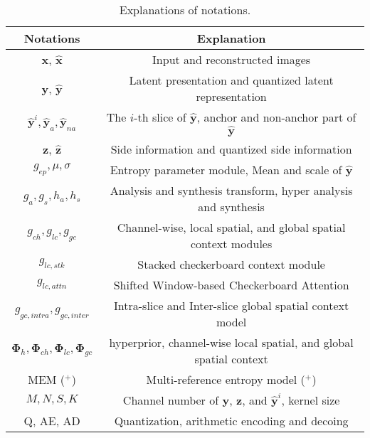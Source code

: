 \documentclass[sigconf]{acmart}
\begin{document}
\begin{table}
  \footnotesize
  \centering
  \begin{tabular}{c|c}
  \toprule
  Notations                                         & Explanation   \\ \midrule
  $\boldsymbol{x}$, $\hat{\boldsymbol{x}}$          & Input and reconstructed images              \\\midrule
  $\boldsymbol{y}$, $\hat{\boldsymbol{y}}$          & Latent presentation and quantized latent representation               \\\midrule
  $\hat{\boldsymbol{y}}^i, \hat{\boldsymbol{y}}_{a}, \hat{\boldsymbol{y}}_{na}$   & The $i$-th slice of $\hat{\boldsymbol{y}}$, anchor and non-anchor part of $\hat{\boldsymbol{y}}$             \\\midrule
  $\boldsymbol{z}$, $\hat{\boldsymbol{z}}$          & Side information and quantized side information               \\\midrule
  $g_{ep}, \mu,\sigma$                              & Entropy parameter module, Mean and scale of $\hat{\boldsymbol{y}}$           \\\midrule
  $g_a, g_s, h_a, h_s$                              & Analysis and synthesis transform, hyper analysis and synthesis          \\\midrule
  $g_{ch}, g_{lc}, g_{gc}$                          & Channel-wise, local spatial, and global spatial context modules           \\\midrule
  $g_{lc,stk}$                                      & Stacked checkerboard context module     \\\midrule
  $g_{lc,attn}$                                     & Shifted Window-based Checkerboard Attention    \\\midrule
  $g_{gc,intra}, g_{gc,inter}$                      & Intra-slice and Inter-slice global spatial context model     \\\midrule
  $ {\boldsymbol{\Phi}}_{h}, {\boldsymbol{\Phi}_{ch}, {\boldsymbol{\Phi}}_{lc}, {\boldsymbol{\Phi}}_{gc}}$ & hyperprior, channel-wise local spatial, and global spatial context   \\\midrule
  MEM ($^+$)                                        & Multi-reference entropy model ($^+$)             \\\midrule
  $M, N, S, K$                                      & Channel number of $\boldsymbol{y}$, $\boldsymbol{z}$, and $\hat{\boldsymbol{y}}^i$, kernel size            \\\midrule
  Q, AE, AD                                         & Quantization, arithmetic encoding and decoing            \\\midrule
  \end{tabular}
  \caption{Explanations of notations.}
  \label{tab:notation}
\end{table}
\end{document}

